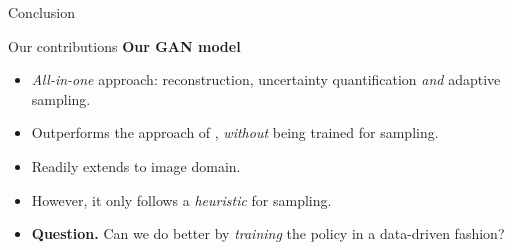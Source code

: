 







\begin{frame}{Conclusion}
    \begin{center}
        \begin{minipage}{0.9\linewidth}
            
        
    
    \begin{block}{Our contributions}
        \textbf{Our GAN model}
    \begin{itemize}
        \vfill\item \textit{All-in-one} approach: reconstruction, uncertainty quantification \textit{and} adaptive sampling.
        \vfill\item Outperforms the approach of \cite{zhang2019reducing}, \textit{without} being trained for sampling. \pause
        \vfill\item Readily extends to image domain.\pause
    \end{itemize}
    
    \end{block}
    \end{minipage}
    \end{center}
    \vfill
    \begin{itemize}
        \item However, it only follows a \textit{heuristic} for sampling.
        \item \textbf{Question.} Can we do better by \textit{training} the policy in a data-driven fashion?
    \end{itemize}
\end{frame}



